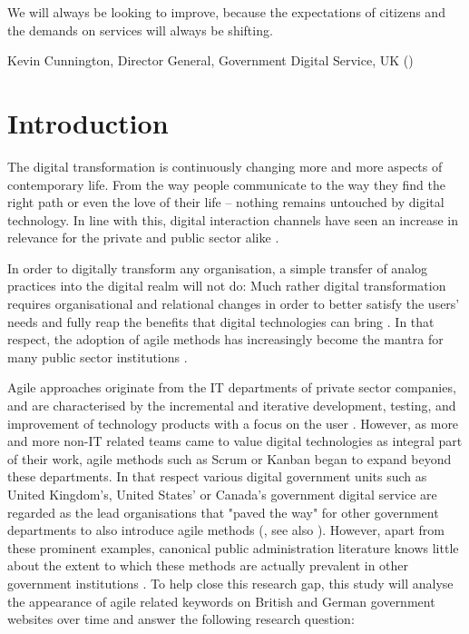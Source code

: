 
\setlength{\epigraphwidth}{0.5\textwidth}
\epigraph{We will always be looking to improve, because the expectations of citizens and the demands on services will always be shifting.}{Kevin Cunnington, Director General, Government Digital Service, UK (\cite*{Cunnington2017})}

\section{Introduction}
\label{Introduction}
The digital transformation is continuously changing more and more aspects of contemporary life. From the way people communicate to the way they find the right path or even the love of their life – nothing remains untouched by digital technology. In line with this, digital interaction channels have seen an increase in relevance for the private and public sector alike \parencite{Koeze2020, WorldEconomicForum2020}.

In order to digitally transform any organisation, a simple transfer of analog practices into the digital realm will not do: Much rather digital transformation requires organisational and relational changes in order to better satisfy the users' needs and fully reap the benefits that digital technologies can bring \parencite{Mergel2019a}. In that respect, the adoption of agile methods has increasingly become the mantra for many public sector institutions \parencite{Lundqvist2016, Vacari2015, Mergel}.

Agile approaches originate from the IT departments of private sector companies, and are characterised by the incremental and iterative development, testing, and improvement of technology products with a focus on the user \parencite{Mergel2016}. However, as more and more non-IT related teams came to value digital technologies as integral part of their work, agile methods such as Scrum or Kanban began to expand beyond these departments. In that respect various digital government units such as United Kingdom's, United States' or Canada's government digital service are regarded as the lead organisations that "paved the way" for other government departments to also introduce agile methods (\cite[2]{Mergel}, see also \cite{Clarke2019}). However, apart from these prominent examples, canonical public administration literature knows little about the extent to which these methods are actually prevalent in other government institutions \parencite{CarvalhoFernandes2016, Vacari2015, Mergel2018, Mergel}. To help close this research gap, this study will analyse the appearance of agile related keywords on British and German government websites over time and answer the following research question:


